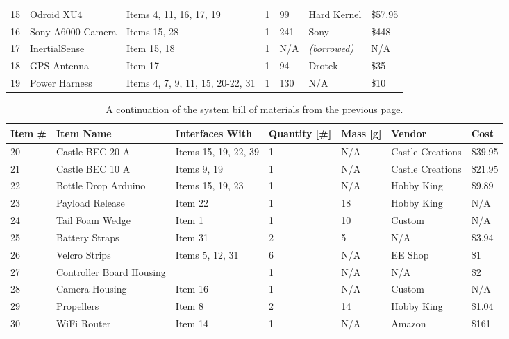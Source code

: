 \documentclass[]{auvsi_doc}
\begin{document}
\begin{table}[h!]
\begin{center}
\begin{tabular}{p{1cm}p{4cm}p{3cm}p{1.5cm}p{1cm}p{2.5cm}p{1cm}}
				15 & Odroid XU4 & Items 4, 11, 16, 17, 19 & 1 & 99 & Hard Kernel & \$57.95 \\
				16 & Sony A6000 Camera & Items 15, 28 & 1 & 241 & Sony & \$448 \\
				17 & InertialSense & Item 15, 18 & 1 & N/A & \textit{(borrowed)} & N/A \\
				18 & GPS Antenna & Item 17 & 1 & 94 & Drotek & \$35  \\
				19 & Power Harness & Items 4, 7, 9, 11, 15, 20-22, 31 & 1 & 130 & N/A & \$10 \\
				\bottomrule
			\end{tabular}
		\end{center}
	\end{table}

	\begin{table}[h!]
		\begin{center}
			\caption{A continuation of the system bill of materials from the previous page.}
			\label{table:BOM}
			\begin{tabular}{p{1cm}p{4cm}p{3cm}p{1.5cm}p{1cm}p{2.5cm}p{1cm}}
				\toprule
				Item \# & Item Name & Interfaces With & Quantity [\#] & Mass [g] & Vendor & Cost \\
				\midrule
				20 & Castle BEC 20 A & Items 15, 19, 22, 39 & 1 & N/A & Castle \newline Creations & \$39.95 \\
				21 & Castle BEC 10 A & Items 9, 19 & 1 & N/A & Castle \newline Creations & \$21.95 \\
				22 & Bottle Drop Arduino & Items 15, 19, 23 & 1 & N/A & Hobby King & \$9.89 \\
				23 & Payload Release & Item 22 & 1 & 18 & Hobby King & N/A \\
				24 & Tail Foam Wedge & Item 1 & 1 & 10 & Custom & N/A \\
				25 & Battery Straps & Item 31 & 2 & 5 & N/A & \$3.94 \\
				26 & Velcro Strips & Items 5, 12, 31 & 6 & N/A & EE Shop & \$1  \\
				27 & Controller Board \newline Housing &   & 1 & N/A & N/A & \$2 \\
				28 & Camera Housing & Item 16 & 1 & N/A & Custom & N/A \\
				29 & Propellers & Item 8 & 2 & 14 & Hobby King & \$1.04 \\
				30 & WiFi Router & Item 14 & 1 & N/A & Amazon & \$161
				 \\

\end{tabular}
\end{center}
\end{table}
\end{document}
